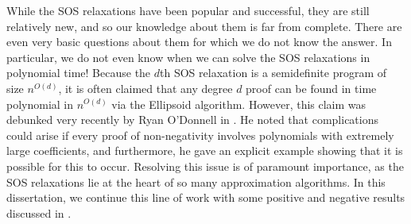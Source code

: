 While the SOS relaxations have been popular and successful, they are still relatively new, and so our knowledge about them is far from complete.
There are even very basic questions about them for which we do not know the answer.
In particular, we do not even know when we can solve the SOS relaxations in polynomial time!
Because the $d$th SOS relaxation is a semidefinite program of size $n^{O(d)}$, it is often claimed that any degree $d$ proof can be found in time polynomial in $n^{O(d)}$ via the Ellipsoid algorithm. However, this claim was debunked very recently by Ryan O'Donnell in \cite{ODon16}.
He noted that complications could arise if every proof of non-negativity involves polynomials with extremely large coefficients, and furthermore, he gave an explicit example showing that it is possible for this to occur.
Resolving this issue is of paramount importance, as the SOS relaxations lie at the heart of so many approximation algorithms.
In this dissertation, we continue this line of work with some positive and negative results discussed in .

